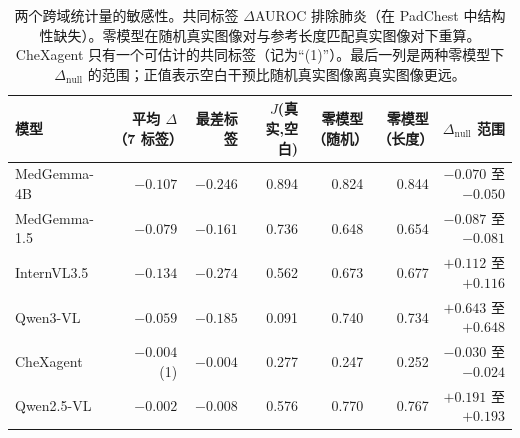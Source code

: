 \begin{table}[H]
\centering
\footnotesize
\setlength{\tabcolsep}{3pt}
\caption{两个跨域统计量的敏感性。共同标签 $\Delta$AUROC 排除肺炎（在 PadChest 中结构性缺失）。零模型在随机真实图像对与参考长度匹配真实图像对下重算。CheXagent 只有一个可估计的共同标签（记为``(1)''）。最后一列是两种零模型下 $\Delta_{\text{null}}$ 的范围；正值表示空白干预比随机真实图像离真实图像更远。}
\label{tab:sens}
\begin{tabular}{lrrrrrr}
\toprule
模型 & 平均 $\Delta$（7 标签） & 最差标签 & $J$(真实,空白) & 零模型（随机） & 零模型（长度） & $\Delta_{\text{null}}$ 范围 \\
\midrule
MedGemma-4B & $-0.107$ & $-0.246$ & 0.894 & 0.824 & 0.844 & $-0.070$ 至 $-0.050$ \\
MedGemma-1.5 & $-0.079$ & $-0.161$ & 0.736 & 0.648 & 0.654 & $-0.087$ 至 $-0.081$ \\
InternVL3.5 & $-0.134$ & $-0.274$ & 0.562 & 0.673 & 0.677 & $+0.112$ 至 $+0.116$ \\
Qwen3-VL & $-0.059$ & $-0.185$ & 0.091 & 0.740 & 0.734 & $+0.643$ 至 $+0.648$ \\
CheXagent & $-0.004$ (1) & $-0.004$ & 0.277 & 0.247 & 0.252 & $-0.030$ 至 $-0.024$ \\
Qwen2.5-VL & $-0.002$ & $-0.008$ & 0.576 & 0.770 & 0.767 & $+0.191$ 至 $+0.193$ \\
\bottomrule
\end{tabular}
\end{table}

